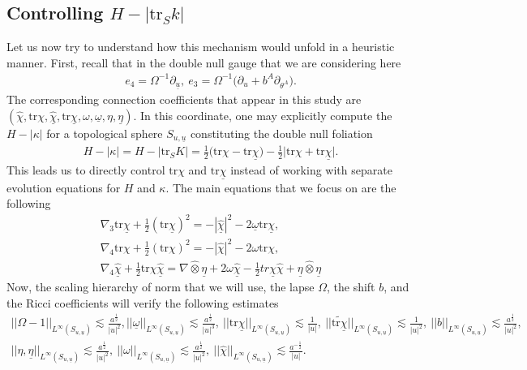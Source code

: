 \documentclass{amsart}
\newcommand{\omegabar}{\underline{\omega}}
\newcommand{\chihat}{\hat{\chi}}
\newcommand{\chibar}{\underline{\chi}}
\newcommand{\chibarhat}{\underline{\hat{\chi}}}
\newcommand{\ubar}{\underline{u}}
\newcommand{\etabar}{\underline{\eta}}
\newcommand{\tr}{\mbox{tr}}
\begin{document}
\subsection{Controlling $H-|\tr_{S}k|$}
\noindent Let us now try to understand how this mechanism would unfold in a heuristic manner. First, recall that in the double null gauge that we are considering here 
\begin{align}
e_{4}=\Omega^{-1}\partial_{\ubar},~e_{3}=\Omega^{-1}\bigg(\partial_{u}+b^{A}\partial_{\theta^{A}}\bigg).   
\end{align}
The corresponding connection coefficients that appear in this study are $(\chihat,\tr\chi,\chibarhat,\tr\chibar,\omega,\omegabar,\eta,\etabar)$. In this coordinate, one may explicitly compute the $H-|\kappa|$ for a topological sphere $S_{u,\ubar}$ constituting the double null foliation 
\begin{align}
\label{eq:c}
H-|\kappa|=H-|\tr_{S}K|=\frac{1}{2}\bigg(\tr\chi-\tr\chibar\bigg)-\frac{1}{2}\bigg|\tr\chi+\tr\chibar\bigg|.    
\end{align}
This leads us to directly control $\tr\chi$ and $\tr\chibar$ instead of working with separate evolution equations for $H$ and $\kappa$. 
The main equations that we focus on are the following 
\begin{align}
\label{eq:trchibar}
 \nabla_{3}\tr\chibar+\frac{1}{2}(\tr\chibar)^{2}=-|\chibarhat|^{2}-2\omegabar\tr\chibar,\\
 \nabla_{4}\tr\chi+\frac{1}{2}(\tr\chi)^{2}=-|\chihat|^{2}-2\omega\tr\chi,\\
 \nabla_{4}\hat{\underline{\chi}}+\frac{1}{2}\tr\chi\hat{\underline{\chi}}=\nabla\hat{\otimes}\underline{\eta}+2\omega\hat{\underline{\chi}}-\frac{1}{2}tr\underline{\chi}\hat{\chi}+\underline{\eta}\hat{\otimes}\underline{\eta}
\end{align}
Now, the scaling hierarchy of norm that we will use, the lapse $\Omega$, the shift $b$, and the Ricci coefficients will verify the following estimates 
\begin{align}
\label{eq:finalbound}
||\Omega-1||_{L^{\infty}(S_{u,\ubar})} \lesssim \frac{a^{\frac{1}{2}}}{|u|^{2}},||\omegabar||_{L^{\infty}(S_{u,\ubar})}\lesssim \frac{a^{\frac{1}{2}}}{|u|^{3}},~||\tr\chibar||_{L^{\infty}(S_{u,\ubar})}\lesssim \frac{1}{|u|},~||\widetilde{\tr\chibar}||_{L^{\infty}(S_{u,\ubar})}\lesssim \frac{1}{|u|^{2}},~||b||_{L^{\infty}(S_{u,\ubar})}\lesssim \frac{ a^{\frac{1}{2}}}{|u|^{2}},\\
||\eta,\etabar||_{L^{\infty}(S_{u,\ubar})}\lesssim \frac{a^{\frac{1}{2}}}{|u|^{2}},~||\omega||_{L^{\infty}(S_{u,\ubar})}\lesssim \frac{a^{\frac{1}{2}}}{|u|^{2}},~||\chihat||_{L^{\infty}(S_{u,\ubar})}\lesssim \frac{a^{-\frac{1}{2}}}{|u|}.
\end{align}
\end{document}
